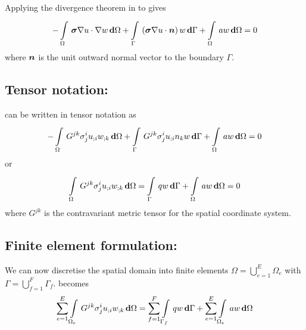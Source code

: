 Applying the divergence theorem in 
to  gives
\begin{equation}
  -\gint{\Omega}{}{\dotprod{\tensor{\sigma}
      \gradient{}{u}}{\gradient{}{w}}}{\Omega}
  +\gint{\Gamma}{}{\pbrac{\dotprod{\tensor{\sigma}\gradient{}{u}}{\normal}}w}{\Gamma}+
  \gint{\Omega}{}{aw}{\Omega}=0
  \label{eqn:Poissonweakform2}
\end{equation}
where $\boldsymbol{n}$ is the unit outward normal vector to the boundary $\Gamma$.

\subsection{Tensor notation:}

 can be written in tensor notation as
\begin{equation}
  -\gint{\Omega}{}{G^{jk}\sigma^{i}_{j}\covarderiv{u}{i}\covarderiv{w}{k}}{\Omega}+
  \gint{\Gamma}{}{G^{jk}\sigma^{i}_{j}\covarderiv{u}{i}n_{k}w}{\Gamma} +
  \gint{\Omega}{}{aw}{\Omega}=0
  \label{eqn:Poissontensorform1}
\end{equation}
or
\begin{equation}
  \gint{\Omega}{}{G^{jk}\sigma^{i}_{j}\covarderiv{u}{i}\covarderiv{w}{k}}{\Omega}
  =\gint{\Gamma}{}{qw}{\Gamma} +
  \gint{\Omega}{}{aw}{\Omega}=0
  \label{eqn:Poissontensorform2}
\end{equation}
where $G^{jk}$ is the contravariant metric tensor for the spatial coordinate system.

\subsection{Finite element formulation:}


We can now discretise the spatial domain into finite elements \ie $\Omega=
\displaystyle{\bigcup_{e=1}^{E}}\Omega_{e}$ with
$\Gamma=\displaystyle{\bigcup_{f=1}^{F}}\Gamma_{f}$. 
 becomes
\begin{equation}
  \dsum_{e=1}^{E}\gint{\Omega_{e}}{}{G^{jk}\sigma^{i}_{j}
    \covarderiv{u}{i}\covarderiv{w}{k}}{\Omega}=
  \dsum_{f=1}^{F}\gint{\Gamma_{f}}{}{qw}{\Gamma} +
  \dsum_{e=1}^{E}\gint{\Omega_{e}}{}{aw}{\Omega}
  \label{eqn:Poissonfemform}
\end{equation}

